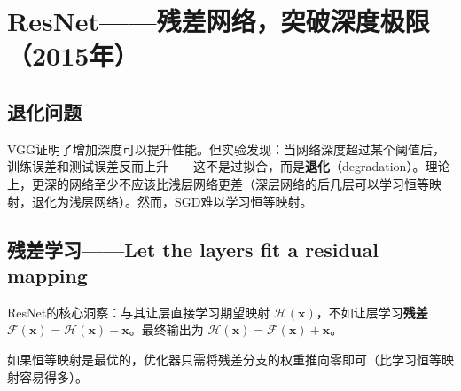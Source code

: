 \section{ResNet——残差网络，突破深度极限（2015年）}

\subsection{退化问题}

VGG证明了增加深度可以提升性能。但实验发现：当网络深度超过某个阈值后，训练误差和测试误差反而上升——这不是过拟合，而是\textbf{退化}（degradation）。理论上，更深的网络至少不应该比浅层网络更差（深层网络的后几层可以学习恒等映射，退化为浅层网络）。然而，SGD难以学习恒等映射。

\subsection{残差学习——Let the layers fit a residual mapping}

ResNet的核心洞察：与其让层直接学习期望映射 $\mathcal{H}(\mathbf{x})$，不如让层学习\textbf{残差} $\mathcal{F}(\mathbf{x}) = \mathcal{H}(\mathbf{x}) - \mathbf{x}$。最终输出为 $\mathcal{H}(\mathbf{x}) = \mathcal{F}(\mathbf{x}) + \mathbf{x}$。

如果恒等映射是最优的，优化器只需将残差分支的权重推向零即可（比学习恒等映射容易得多）。

